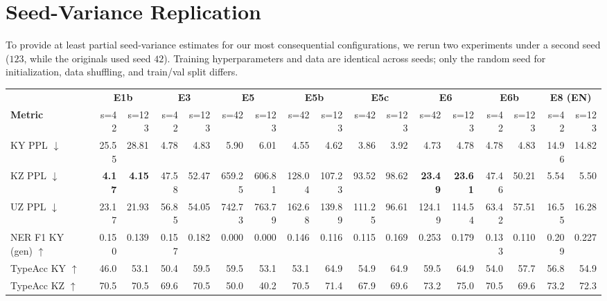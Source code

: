 \documentclass[11pt]{article}
\begin{document}
\section{Seed-Variance Replication}
\label{app:seed_variance}

To provide at least partial seed-variance estimates for our most consequential configurations, we rerun two experiments under a second seed ($123$, while the originals used seed $42$). Training hyperparameters and data are identical across seeds; only the random seed for initialization, data shuffling, and train/val split differs.

\begin{table}[t]
\centering
\scriptsize
\setlength{\tabcolsep}{1.8pt}
\begin{tabular}{lrrrrrrrrrrrrrrrr}
\toprule
 & \multicolumn{2}{c}{\textbf{E1b}} & \multicolumn{2}{c}{\textbf{E3}} & \multicolumn{2}{c}{\textbf{E5}} & \multicolumn{2}{c}{\textbf{E5b}} & \multicolumn{2}{c}{\textbf{E5c}} & \multicolumn{2}{c}{\textbf{E6}} & \multicolumn{2}{c}{\textbf{E6b}} & \multicolumn{2}{c}{\textbf{E8 (EN)}} \\
\cmidrule(lr){2-3}\cmidrule(lr){4-5}\cmidrule(lr){6-7}\cmidrule(lr){8-9}\cmidrule(lr){10-11}\cmidrule(lr){12-13}\cmidrule(lr){14-15}\cmidrule(lr){16-17}
\textbf{Metric} & s=42 & s=123 & s=42 & s=123 & s=42 & s=123 & s=42 & s=123 & s=42 & s=123 & s=42 & s=123 & s=42 & s=123 & s=42 & s=123 \\
\midrule
KY PPL $\downarrow$         & 25.55 & 28.81 & 4.78 & 4.83 & 5.90 & 6.01 & 4.55 & 4.62 & 3.86 & 3.92 & 4.73 & 4.78 & 4.78 & 4.83 & 14.96 & 14.82 \\
KZ PPL $\downarrow$         & \textbf{4.17} & \textbf{4.15} & 47.58 & 52.47 & 659.25 & 606.81 & 128.04 & 107.23 & 93.52 & 98.62 & \textbf{23.49} & \textbf{23.61} & 47.46 & 50.21 & 5.54 & 5.50 \\
UZ PPL $\downarrow$         & 23.17 & 21.93 & 56.85 & 54.05 & 742.73 & 763.79 & 162.68 & 139.89 & 111.25 & 96.61 & 124.19 & 114.54 & 63.42 & 57.51 & 16.55 & 16.28 \\
NER F1 KY (gen) $\uparrow$  & 0.150 & 0.139 & 0.157 & 0.182 & 0.000 & 0.000 & 0.146 & 0.116 & 0.115 & 0.169 & 0.253 & 0.179 & 0.133 & 0.110 & 0.209 & 0.227 \\
TypeAcc KY $\uparrow$       & 46.0 & 53.1 & 50.4 & 59.5 & 59.5 & 53.1 & 53.1 & 64.9 & 54.9 & 64.9 & 59.5 & 64.9 & 54.0 & 57.7 & 56.8 & 54.9 \\
TypeAcc KZ $\uparrow$       & 70.5 & 70.5 & 69.6 & 70.5 & 50.0 & 40.2 & 70.5 & 71.4 & 67.9 & 69.6 & 73.2 & 75.0 & 70.5 & 69.6 & 73.2 & 72.3 \\

\end{tabular}
\end{table}
\end{document}
